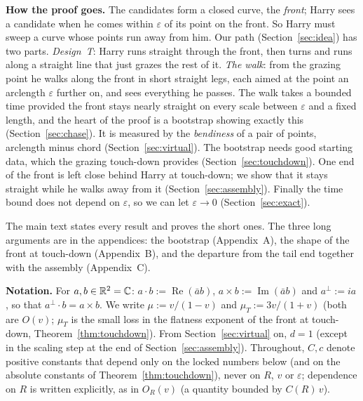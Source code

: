 \textbf{How the proof goes.} The candidates form a closed curve, the \emph{front}; Harry sees a candidate when he comes
within $\varepsilon$ of its point on the front. So Harry must sweep a curve whose points run away from him. Our path
(Section~\ref{sec:idea}) has two parts. \emph{Design~T}: Harry runs straight through the front, then turns and runs
along a straight line that just grazes the rest of it. \emph{The walk}: from the grazing point he walks along the
front in short straight legs, each aimed at the point an arclength $\varepsilon$ further on, and sees everything he
passes. The walk takes a bounded time provided the front stays nearly straight on every scale between $\varepsilon$
and a fixed length, and the heart of the proof is a bootstrap showing exactly this (Section~\ref{sec:chase}). It is
measured by the \emph{bendiness} of a pair of points, arclength minus chord (Section~\ref{sec:virtual}). The bootstrap
needs good starting data, which the grazing touch-down provides (Section~\ref{sec:touchdown}). One end of the front is
left close behind Harry at touch-down; we show that it stays straight while he walks away from it
(Section~\ref{sec:assembly}). Finally the time bound does not depend on $\varepsilon$, so we can let $\varepsilon\to0$
(Section~\ref{sec:exact}).

The main text states every result and proves the short ones. The three long arguments are in the appendices: the
bootstrap (Appendix~A), the shape of the front at touch-down (Appendix~B), and the departure from the tail end together
with the assembly (Appendix~C).

\textbf{Notation.} For $a,b\in\mathbb{R}^2=\mathbb{C}$: $a\cdot b:=\operatorname{Re}(\bar ab)$, $a\times b:=\operatorname{Im}(\bar ab)$
and $a^\perp:=ia$, so that $a^\perp\cdot b=a\times b$. We write $\mu:=v/(1-v)$ and $\mu_T:=3v/(1+v)$ (both are
$O(v)$; $\mu_T$ is the small loss in the flatness exponent of the front at touch-down, Theorem~\ref{thm:touchdown}).
From Section~\ref{sec:virtual} on, $d=1$ (except in the scaling step at the end of Section~\ref{sec:assembly}).
Throughout, $C,c$ denote positive constants that depend only on the locked numbers below (and on the absolute constants
of Theorem~\ref{thm:touchdown}), never on $R$, $v$ or $\varepsilon$; dependence on $R$ is written explicitly, as in
$O_R(v)$ (a quantity bounded by $C(R)\,v$).

